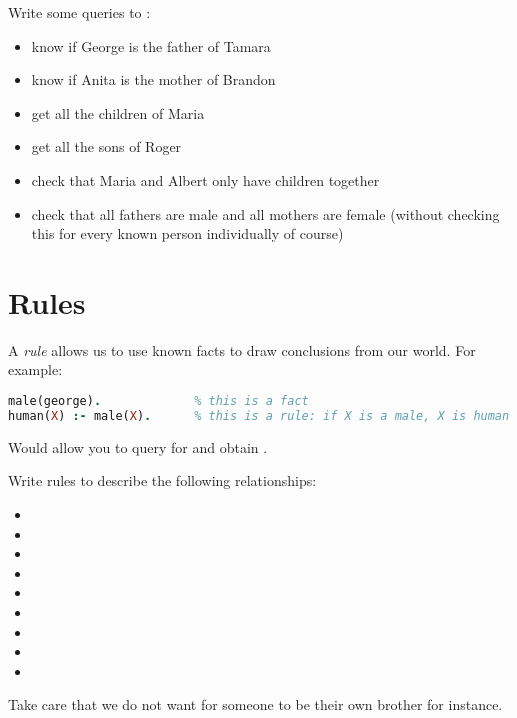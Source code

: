 \documentclass{../../../tp}
\begin{document}
\begin{instruction}
	Write some queries to :
	\begin{itemize}
		\item know if George is the father of Tamara
		\item know if Anita is the mother of Brandon
		\item get all the children of Maria
		\item get all the sons of Roger
		\item check that Maria and Albert only have children together
		\item check that all fathers are male and all mothers are female (without checking this for every known person individually of course)
	\end{itemize}
\end{instruction}

\section{Rules}

A \emph{rule} allows us to use known facts to draw conclusions from our world. For example:

\begin{lstlisting}[language=prolog]
male(george).             % this is a fact
human(X) :- male(X).      % this is a rule: if X is a male, X is human
\end{lstlisting}

Would allow you to query for  and obtain .


\begin{instruction}
	Write rules to describe the following relationships:
	\begin{itemize}
	 \item {}
	 \item {}
	 \item {}
	 \item {}
	 \item {}
	 \item {}
	 \item {}
	 \item {}
	 \item {}
	\end{itemize}
	
	Take care that we do not want for someone to be their own brother for instance.
\end{instruction}
\end{document}
